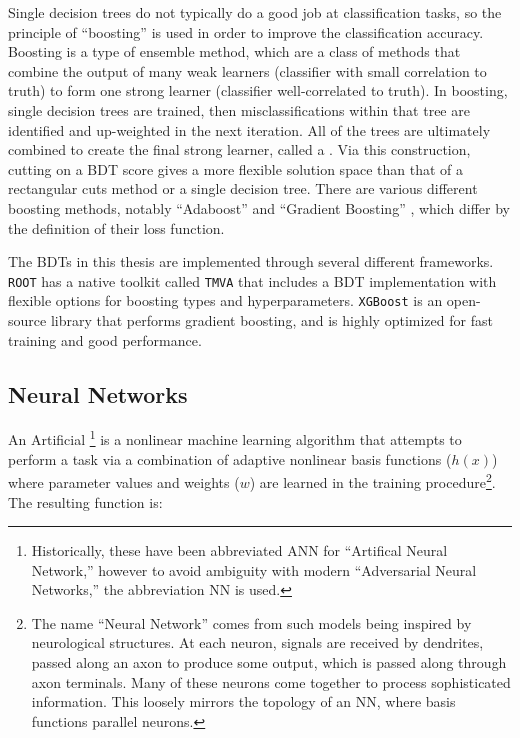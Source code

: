 Single decision trees do not typically do a good job at classification tasks, so the principle of ``boosting'' is used in order to improve the classification accuracy. Boosting is a type of ensemble method, which are a class of methods that combine the output of many weak learners (classifier with small correlation to truth) to form one strong learner (classifier well-correlated to truth). In boosting, single decision trees are trained, then misclassifications within that tree are identified and up-weighted in the next iteration. All of the trees are ultimately combined to create the final strong learner, called a . Via this construction, cutting on a \gls{BDT} score gives a more flexible solution space than that of a rectangular cuts method or a single decision tree. There are various different boosting methods, notably ``Adaboost'' \cite{adaboost} and ``Gradient Boosting'' \cite{gradBoost}, which differ by the definition of their loss function.

The \glspl{BDT} in this thesis are implemented through several different frameworks. \texttt{ROOT} \cite{ROOT} has a native toolkit called \texttt{TMVA} \cite{TMVA} that includes a \gls{BDT} implementation with flexible options for boosting types and hyperparameters. \texttt{XGBoost} \cite{XGBoost} is an open-source library that performs gradient boosting, and is highly optimized for fast training and good performance.


\subsection{Neural Networks}

An Artificial \footnote{Historically, these have been abbreviated ANN for ``Artifical Neural Network,'' however to avoid ambiguity with modern ``Adversarial Neural Networks,'' the abbreviation NN is used.} is a nonlinear machine learning algorithm that attempts to perform a task via a combination of adaptive nonlinear basis functions ($h(x)$) where parameter values and weights ($w$) are learned in the training procedure\footnote{The name ``Neural Network'' comes from such models being inspired by neurological structures. At each neuron, signals are received by dendrites, passed along an axon to produce some output, which is passed along through axon terminals. Many of these neurons come together to process sophisticated information. This loosely mirrors the topology of an \gls{NN}, where basis functions parallel neurons.}. The resulting function is:

